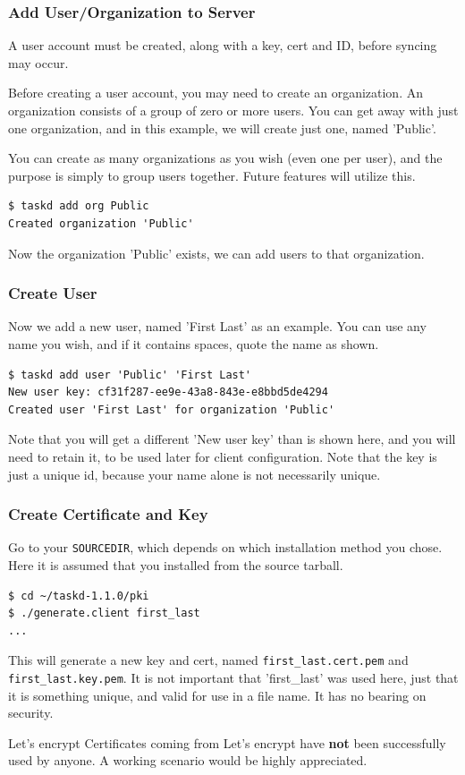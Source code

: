 \documentclass[t,handout]{beamer}
\begin{document}
\begin{frame}[fragile]\frametitle{Add User/Organization to Server}
    \vfill
    A user account must be created, along with a key, cert and ID, before syncing may occur.

    Before creating a user account, you may need to create an organization. An organization consists of a group of zero or more users. You can get away with just one organization, and in this example, we will create just one, named 'Public'.

    You can create as many organizations as you wish (even one per user), and the purpose is simply to group users together. Future features will utilize this.

    \begin{lstlisting}
$ taskd add org Public
Created organization 'Public'\end{lstlisting}

  Now the organization 'Public' exists, we can add users to that organization.
\end{frame}

\begin{frame}[fragile]\frametitle{Create User}
    \vfill
    Now we add a new user, named 'First Last' as an example.  You can use any name you wish, and if it contains spaces, quote the name as shown.

    \begin{lstlisting}
$ taskd add user 'Public' 'First Last'
New user key: cf31f287-ee9e-43a8-843e-e8bbd5de4294
Created user 'First Last' for organization 'Public'\end{lstlisting}

    Note that you will get a different 'New user key' than is shown here, and you will need to retain it, to be used later for client configuration.  Note that the key is just a unique id, because your name alone is not necessarily unique.
\end{frame}

\begin{frame}[fragile]\frametitle{Create Certificate and Key}
    \vfill
    Go to your \verb+SOURCEDIR+, which depends on which installation method you chose. Here it is assumed that you installed from the source tarball.

    \begin{lstlisting}
$ cd ~/taskd-1.1.0/pki
$ ./generate.client first_last
...\end{lstlisting}

    This will generate a new key and cert, named \verb+first_last.cert.pem+ and \verb+first_last.key.pem+. It is not important that 'first\_last' was used here, just that it is something unique, and valid for use in a file name. It has no bearing on security.

    \begin{alertblock}{Let's encrypt}
        Certificates coming from Let's encrypt have \textbf{not} been successfully used by anyone. A working scenario would be highly appreciated.
    \end{alertblock}
\end{frame}
\end{document}
